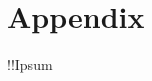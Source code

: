 \documentclass[10pt,twoside,reqno]{article}
\begin{document}
\clearpage
\section*{Appendix} %
\setcounter{section}{0}
\renewcommand{\thesection}{A-\arabic{section}}
\setcounter{figure}{0}
\renewcommand{\thefigure}{A-\arabic{figure}}
\setcounter{table}{0}
\renewcommand{\thetable}{A-\arabic{table}}

!!Ipsum






\cleardoublepage
\end{document}
